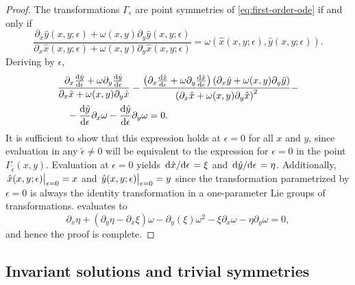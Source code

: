 \begin{proof}
  The transformations \(\Gamma_\epsilon\) are point symmetries of \cref{eq:first-order-ode} if and only if
  \begin{equation} \label{eq:parametrized-symmetry-cond}
    \frac{\partial_x \hat{y}(x,y;\epsilon) + \omega(x,y) \partial_y \hat{y}(x,y;\epsilon)}{\partial_x \hat{x}(x,y;\epsilon) + \omega(x,y) \partial_y \hat{x}(x,y;\epsilon)} = \omega(\hat{x}(x,y;\epsilon),\hat{y}(x,y;\epsilon)).
  \end{equation}
  Deriving by \(\epsilon\),
  \begin{equation}
    \begin{split} \label{eq:derive-symmetry-cond}
      &\frac{\partial_x \diff{\hat{y}}{\epsilon} + \omega \partial_y \diff{\hat{y}}{\epsilon}}{\partial_x \hat{x} + \omega(x,y) \partial_y \hat{x}} - \frac{\left(\partial_x \diff{\hat{x}}{\epsilon}  + \omega \partial_y \diff{\hat{x}}{\epsilon}\right)\left(\partial_x \hat{y} + \omega(x,y) \partial_y \hat{y}\right)}{\left(\partial_x \hat{x} + \omega(x,y) \partial_y \hat{x}\right)^2} -\\
      &\quad- \diff{\hat{y}}{\epsilon} \partial_x \omega - \diff{\hat{y}}{\epsilon} \partial_y \omega = 0.
    \end{split}
  \end{equation}
  It is sufficient to show that this expression holds at \(\epsilon = 0\) for all \(x\) and \(y\), since evaluation in any \(\tilde{\epsilon} \neq 0\) will be equivalent to the expression for \(\epsilon = 0\) in the point \(\Gamma_{\tilde{\epsilon}}(x, y)\).
  Evaluation at \(\epsilon = 0\) yields \(\dv*{\hat{x}}{\epsilon} = \xi\) and \(\dv*{\hat{y}}{\epsilon} = \eta\).
  Additionally, \(\eval{\hat{x}(x,y;\epsilon)}_{\epsilon = 0} = x\) and \(\eval{\hat{y}(x,y;\epsilon)}_{\epsilon = 0} = y\) since the transformation parametrized by \(\epsilon = 0\) is always the identity transformation in a one-parameter Lie groups of transformations.
   evaluates to
  \begin{equation} \label{eq:linearized-first-order-symmetry-result}
    \partial_x \eta + (\partial_y \eta - \partial_x \xi) \omega - \partial_y (\xi) \omega^2 
    -\xi \partial_x \omega - \eta \partial_y \omega = 0,
  \end{equation}
  and hence the proof is complete.
\end{proof}

\subsection{Invariant solutions and trivial symmetries}

